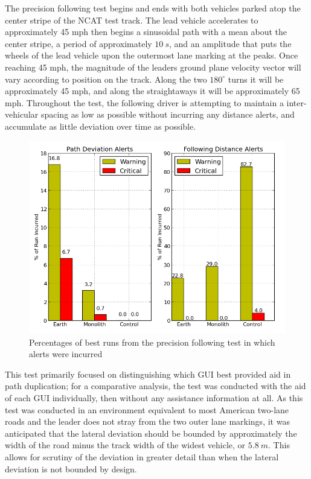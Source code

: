 \documentclass[twocolumn,10pt]{article}
\begin{document}
    The precision following test begins and ends with both vehicles parked atop the center stripe of the NCAT test track.  The lead vehicle accelerates to approximately 45 mph then begins a sinusoidal path with a mean about the center stripe, a period of approximately $10~s$, and an amplitude that puts the wheels of the lead vehicle upon the outermost lane marking at the peaks.  Once reaching 45 mph, the magnitude of the leaders ground plane velocity vector will vary according to position on the track.  Along the two $180^{\circ}$ turns it will be approximately 45 mph, and along the straightaways it will be approximately 65 mph.  Throughout the test, the following driver is attempting to maintain a inter-vehicular spacing as low as possible without incurring any distance alerts, and accumulate as little deviation over time as possible.

    \begin{figure}[ht] \centering
      \includegraphics[width=\columnwidth]{../graphics/precision_following_alert_percents.png}
      \caption{Percentages of best runs from the precision following test in which alerts were incurred}
      \label{fig:precision_following_alert_percents}
    \end{figure}

    This test primarily focused on distinguishing which GUI best provided aid in path duplication; for a comparative analysis, the test was conducted with the aid of each GUI individually, then without any assistance information at all.  As this test was conducted in an environment equivalent to most American two-lane roads and the leader does not stray from the two outer lane markings, it was anticipated that the lateral deviation should be bounded by approximately the width of the road minus the track width of the widest vehicle, or $5.8~m$.  This allows for scrutiny of the deviation in greater detail than when the lateral deviation is not bounded by design.
\end{document}
